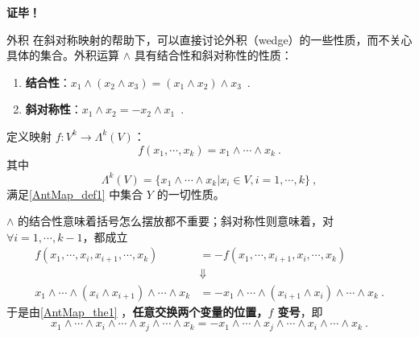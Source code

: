 \textbf{证毕！}
\begin{example}{外积}\label{AntMap_ex1}
在斜对称映射的帮助下，可以直接讨论外积（wedge）的一些性质，而不关心具体的集合。外积运算 $\wedge$ 具有结合性和斜对称性的性质：
\begin{enumerate}
\item \textbf{结合性}：$x_1\wedge(x_2\wedge x_3)=(x_1\wedge x_2)\wedge x_3$~.
\item \textbf{斜对称性}：$x_1\wedge x_2=-x_2\wedge x_1$~.
\end{enumerate}

定义映射 $f:V^k\rightarrow \Lambda^k(V)$：
\begin{equation}
f(x_1,\cdots,x_k)=x_1\wedge\cdots\wedge x_k~.
\end{equation}
其中
\begin{equation}
\Lambda^k(V)=\{x_1\wedge\cdots\wedge x_k| x_i\in V,i=1,\cdots,k\}~,
\end{equation}
满足\autoref{AntMap_def1} 中集合 $Y$ 的一切性质。

$\wedge$ 的结合性意味着括号怎么摆放都不重要；斜对称性则意味着，对 $\forall i=1,\cdots,k-1$，都成立
\begin{equation}
\begin{aligned}
f(x_1,\cdots,x_i,x_{i+1},\cdots,x_k)&=-f(x_1,\cdots,x_{i+1},x_i,\cdots,x_k)\\
&\Downarrow\\
x_1\wedge\cdots\wedge (x_i\wedge x_{i+1})\wedge\cdots\wedge x_k&=-x_1\wedge\cdots\wedge (x_{i+1}\wedge x_{i})\wedge\cdots\wedge x_k~.
\end{aligned}
\end{equation}
于是由\autoref{AntMap_the1} ，\textbf{任意交换两个变量的位置，$f$ 变号}，即
\begin{equation}
x_1\wedge\cdots\wedge x_i\wedge\cdots\wedge x_j\wedge\cdots\wedge x_k=-x_1\wedge\cdots\wedge x_j\wedge\cdots\wedge x_i\wedge\cdots\wedge x_k~.
\end{equation}


\end{example}
